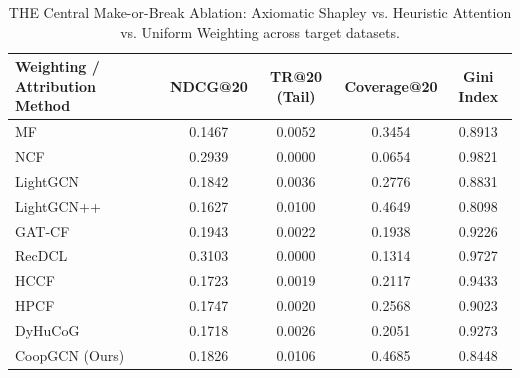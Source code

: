 \begin{table}[t]
\centering
\caption{THE Central Make-or-Break Ablation: Axiomatic Shapley vs. Heuristic Attention vs. Uniform Weighting across target datasets.}
\label{tab:central_ablation}
\begin{tabular}{lcccc}
\toprule
\textbf{Weighting / Attribution Method} & \textbf{NDCG@20} & \textbf{TR@20 (Tail)} & \textbf{Coverage@20} & \textbf{Gini Index} \\
\midrule
MF & 0.1467 & 0.0052 & 0.3454 & 0.8913 \\
NCF & 0.2939 & 0.0000 & 0.0654 & 0.9821 \\
LightGCN & 0.1842 & 0.0036 & 0.2776 & 0.8831 \\
LightGCN++ & 0.1627 & 0.0100 & 0.4649 & 0.8098 \\
GAT-CF & 0.1943 & 0.0022 & 0.1938 & 0.9226 \\
RecDCL & 0.3103 & 0.0000 & 0.1314 & 0.9727 \\
HCCF & 0.1723 & 0.0019 & 0.2117 & 0.9433 \\
HPCF & 0.1747 & 0.0020 & 0.2568 & 0.9023 \\
DyHuCoG & 0.1718 & 0.0026 & 0.2051 & 0.9273 \\
CoopGCN (Ours) & 0.1826 & 0.0106 & 0.4685 & 0.8448 \\
\bottomrule
\end{tabular}
\end{table}
